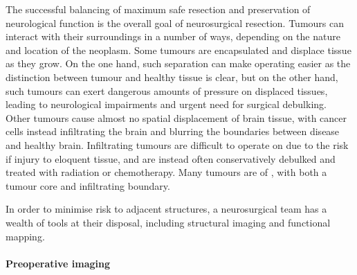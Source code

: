 The successful balancing of maximum safe resection and preservation of neurological function is the overall goal of neurosurgical resection.
Tumours can interact with their surroundings in a number of ways, depending on the nature and location of the neoplasm.
Some tumours are encapsulated and displace tissue as they grow.
On the one hand, such separation can make operating easier as the distinction between tumour and healthy tissue is clear, but on the other hand, such tumours can exert dangerous amounts of pressure on displaced tissues, leading to neurological impairments and urgent need for surgical debulking.
Other tumours cause almost no spatial displacement of brain tissue, with cancer cells instead infiltrating the brain and blurring the boundaries between disease and healthy brain.
Infiltrating tumours are difficult to operate on due to the risk if injury to eloquent tissue, and are instead often conservatively debulked and treated with radiation or chemotherapy.
Many tumours are of , with both a tumour core and infiltrating boundary.

In order to minimise risk to adjacent structures, a neurosurgical team has a wealth of tools at their disposal, including structural imaging and functional mapping.

\paragraph*{Preoperative imaging}


